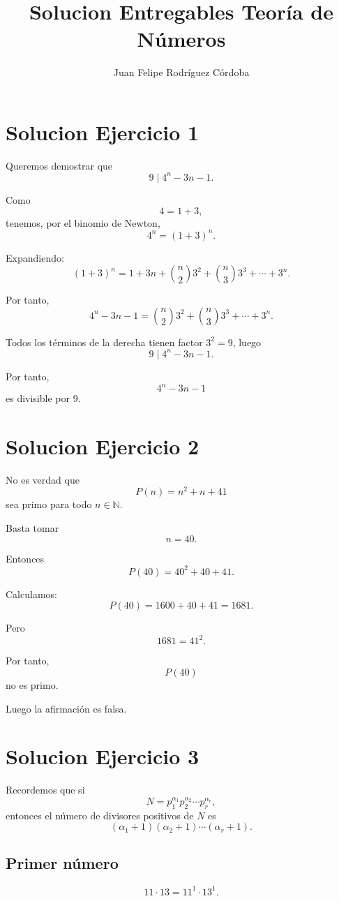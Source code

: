 \documentclass[12pt]{article}
\title{Solucion Entregables Teoría de Números}
\author{Juan Felipe Rodríguez Córdoba}
\date{}
\begin{document}
\maketitle

\section*{Solucion Ejercicio 1}

Queremos demostrar que
\[
9 \mid 4^n - 3n - 1.
\]

Como
\[
4=1+3,
\]
tenemos, por el binomio de Newton,
\[
4^n=(1+3)^n.
\]

Expandiendo:
\[
(1+3)^n
=
1+3n+\binom{n}{2}3^2+\binom{n}{3}3^3+\cdots+3^n.
\]

Por tanto,
\[
4^n-3n-1
=
\binom{n}{2}3^2+\binom{n}{3}3^3+\cdots+3^n.
\]

Todos los términos de la derecha tienen factor \(3^2=9\), luego
\[
9 \mid 4^n-3n-1.
\]

Por tanto,
\[
4^n-3n-1
\]
es divisible por \(9\).

\section*{Solucion Ejercicio 2}

No es verdad que
\[
P(n)=n^2+n+41
\]
sea primo para todo \(n\in\mathbb{N}\).

Basta tomar
\[
n=40.
\]

Entonces
\[
P(40)=40^2+40+41.
\]

Calculamos:
\[
P(40)=1600+40+41=1681.
\]

Pero
\[
1681=41^2.
\]

Por tanto,
\[
P(40)
\]
no es primo.

Luego la afirmación es falsa.

\section*{Solucion Ejercicio 3}

Recordemos que si
\[
N=p_1^{\alpha_1}p_2^{\alpha_2}\cdots p_r^{\alpha_r},
\]
entonces el número de divisores positivos de \(N\) es
\[
(\alpha_1+1)(\alpha_2+1)\cdots(\alpha_r+1).
\]

\subsection*{Primer número}

\[
11\cdot 13 = 11^1\cdot 13^1.
\]
\end{document}
